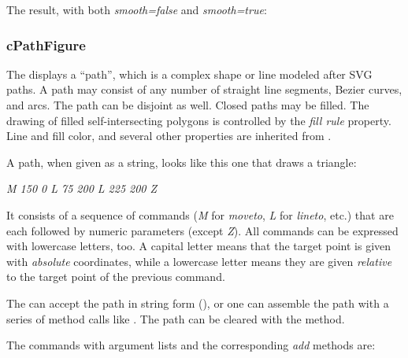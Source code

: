 
The result, with both \textit{smooth=false} and \textit{smooth=true}:

\begin{center}

\end{center}


\subsubsection{cPathFigure}
\label{sec:graphics:pathfigure}

The  displays a ``path'', which is a complex shape or line modeled after SVG
paths. A path may consist of any number of straight line segments, Bezier
curves, and arcs. The path can be disjoint as well. Closed paths may be filled.
The drawing of filled self-intersecting polygons is controlled by the
\textit{fill rule} property. Line and fill color, and several other properties
are inherited from .

A path, when given as a string, looks like this one that draws a triangle:

\textit{M 150 0 L 75 200 L 225 200 Z}

It consists of a sequence of commands (\textit{M} for \textit{moveto},
\textit{L} for \textit{lineto}, etc.) that are each followed by numeric
parameters (except \textit{Z}). All commands can be expressed with
lowercase letters, too. A capital letter means that the target point is
given with \textit{absolute} coordinates, while a lowercase letter means they are
given \textit{relative} to the target point of the previous command.

The  can accept the path in string form (),
or one can assemble the path with a series of method calls like
. The path can be cleared with the 
method.

The commands with argument lists and the corresponding \textit{add} methods are:

